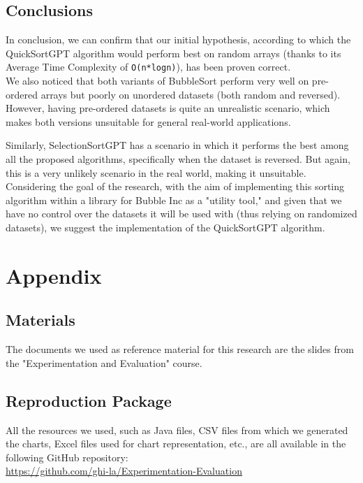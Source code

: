 \documentclass{article}
\begin{document}
\subsection{Conclusions}
In conclusion, we can confirm that our initial hypothesis, according to which the QuickSortGPT algorithm would perform best on random arrays (thanks to its Average Time Complexity of \texttt{O(n*logn)}), has been proven correct.\\

We also noticed that both variants of BubbleSort perform very well on pre-ordered arrays but poorly on unordered datasets (both random and reversed). However, having pre-ordered datasets is quite an unrealistic scenario, which makes both versions unsuitable for general real-world applications.

Similarly, SelectionSortGPT has a scenario in which it performs the best among all the proposed algorithms, specifically when the dataset is reversed. But again, this is a very unlikely scenario in the real world, making it unsuitable.\\

Considering the goal of the research, with the aim of implementing this sorting algorithm within a library for Bubble Inc as a "utility tool," and given that we have no control over the datasets it will be used with (thus relying on randomized datasets), we suggest the implementation of the QuickSortGPT algorithm.

\newpage

\section{Appendix}\label{chap:appendix}
\subsection{Materials}
The documents we used as reference material for this research are the slides from the "Experimentation and Evaluation" course.

\subsection{Reproduction Package}
All the resources we used, such as Java files, CSV files from which we generated the charts, Excel files used for chart representation, etc., are all available in the following GitHub repository: \\
\url{https://github.com/ghi-la/Experimentation-Evaluation}
\end{document}
